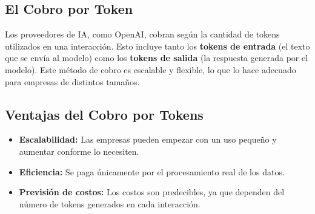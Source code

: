 
\subsection{El Cobro por Token}\label{el-cobro-por-token}
Los proveedores de IA, como OpenAI, cobran según la cantidad de tokens utilizados en una interacción. Esto incluye tanto los \textbf{tokens de entrada} (el texto que se envía al modelo) como los \textbf{tokens de salida} (la respuesta generada por el modelo). Este método de cobro es escalable y flexible, lo que lo hace adecuado para empresas de distintos tamaños.

\subsection{Ventajas del Cobro por Tokens}\label{ventajas-del-cobro-por-tokens}
\begin{itemize}
    \item \textbf{Escalabilidad:} Las empresas pueden empezar con un uso pequeño y aumentar conforme lo necesiten.
    \item \textbf{Eficiencia:} Se paga únicamente por el procesamiento real de los datos.
    \item \textbf{Previsión de costos:} Los costos son predecibles, ya que dependen del número de tokens generados en cada interacción.
\end{itemize}


